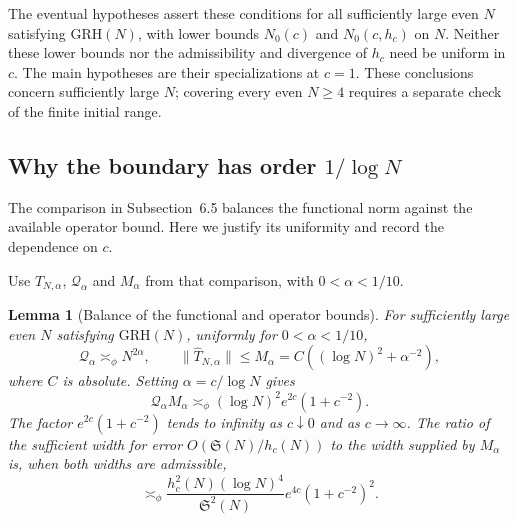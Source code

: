 \documentclass[12pt,a4paper]{amsart}
\numberwithin{equation}{section}
\def\le{\leqslant}
\def\ge{\geqslant}
\theoremstyle{plain}
\newtheorem{lemma}[proposition]{Lemma}
\theoremstyle{definition}
\theoremstyle{remark}
\begin{document}
The eventual hypotheses assert these conditions for all sufficiently
large even $N$ satisfying $\mathrm{GRH}(N)$, with lower bounds
$N_0(c)$ and $N_0(c,h_c)$ on $N$. Neither these lower bounds nor
the admissibility and divergence of $h_c$ need be uniform in $c$.
The main hypotheses are their specializations at $c=1$.
These conclusions concern sufficiently large $N$; covering every
even $N\ge4$ requires a separate check of the finite initial range.

\subsection{Why the boundary has order \texorpdfstring{$1/\log N$}{1/log N}}
\label{proof:app:param:balance}\label{proof:bm:boundary-balance}

The comparison in Subsection~6.5 balances the
functional norm against the available operator bound. Here we
justify its uniformity and record the dependence on $c$.

Use $\widehat T_{N,\alpha}$, $\mathcal Q_\alpha$ and $M_\alpha$
from that comparison, with $0<\alpha<1/10$.

\begin{lemma}[Balance of the functional and operator bounds]
\label{proof:v9:boundary-balance}
For sufficiently large even $N$ satisfying $\mathrm{GRH}(N)$,
uniformly for $0<\alpha<1/10$,
\[
 \mathcal Q_\alpha\asymp_\phi N^{2\alpha},\qquad
 \|\widehat T_{N,\alpha}\|\le
 M_\alpha=C((\log N)^2+\alpha^{-2}),
\]
where $C$ is absolute. Setting $\alpha=c/\log N$ gives
\[
 \mathcal Q_\alpha M_\alpha
 \asymp_\phi(\log N)^2e^{2c}(1+c^{-2}).
\]
The factor $e^{2c}(1+c^{-2})$ tends to infinity as $c\downarrow0$
and as $c\to\infty$.
The ratio of the
sufficient width for error $O(\mathfrak S(N)/h_c(N))$ to the
width supplied by $M_\alpha$ is, when both widths are admissible,
\[
 \asymp_\phi
 \frac{h_c^2(N)(\log N)^4}{\mathfrak S^2(N)}
       e^{4c}(1+c^{-2})^2.
\]
\end{lemma}
\end{document}
